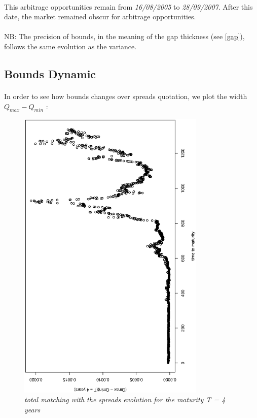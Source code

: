 \paragraph{}
This   arbitrage   opportunities   remain   from  {\it   16/08/2005}   to   {\it
  28/09/2007}. After this date, the market remained obscur for arbitrage opportunities.
\paragraph{}
NB: The precision of bounds, in the meaning of the gap thickness (see \ref{gap}),
follows the same evolution as the variance.


\subsection{Bounds Dynamic}
\label{sec:bounds-effectiveness}
\paragraph{}
In order  to see how  bounds changes over spreads  quotation, we plot  the width
$Q_{max}-Q_{min}$ :
\begin{figure}[H]
  \centering
  \includegraphics[angle=-90,width=0.8\textwidth]{bounds_Dynamic_T_4}
  \caption{\it total matching with the spreads evolution for the maturity T = 4 years}
  \label{fig:10}
\end{figure}

